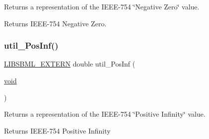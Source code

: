 Returns a representation of the I\+E\+E\+E-\/754 \char`\"{}\+Negative Zero\char`\"{} value.

\begin{DoxyReturn}{Returns}
I\+E\+E\+E-\/754 Negative Zero. 
\end{DoxyReturn}
\mbox{\label{dependencies_2libsbml-5_815_80-vs2017-release-64_2include_2sbml_2util_2util_8h_a558912238a8cb2dafd547a85c7ab208b}} 
\subsubsection{\texorpdfstring{util\+\_\+\+Pos\+Inf()}{util\_PosInf()}}
{\footnotesize\ttfamily \hyperlink{extern_8h_a8e9e5118f0c55d410f8bc217f2954dbf}{L\+I\+B\+S\+B\+M\+L\+\_\+\+E\+X\+T\+E\+RN} double util\+\_\+\+Pos\+Inf (\begin{DoxyParamCaption}\item[{\hyperlink{lp__lib_8h_ac7828c7b2b31d2e11af17bdb6289c5d9}{void}}]{ }\end{DoxyParamCaption})}

Returns a representation of the I\+E\+E\+E-\/754 \char`\"{}\+Positive Infinity\char`\"{} value.

\begin{DoxyReturn}{Returns}
I\+E\+E\+E-\/754 Positive Infinity 
\end{DoxyReturn}

